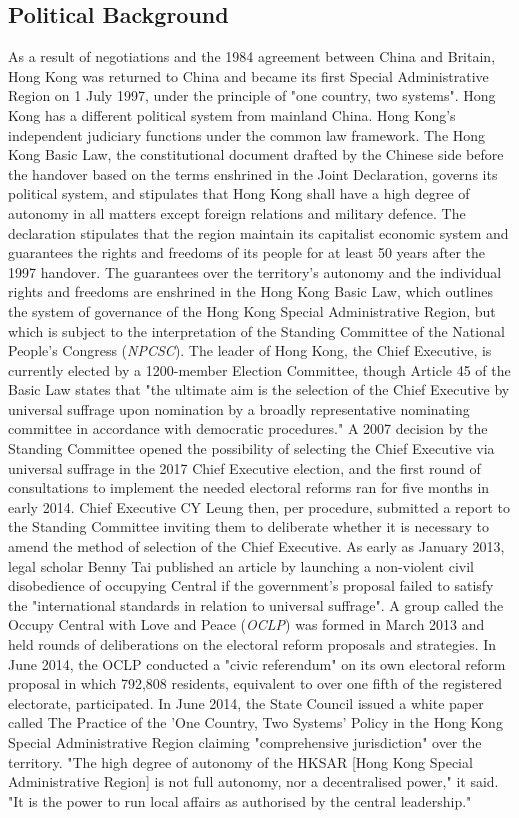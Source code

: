 \documentclass[10pt,conference,a4paper]{IEEEtran}%
\begin{document}
\subsection{Political Background}
As a result of negotiations and the 1984 agreement between China and Britain, Hong Kong was returned to China and became its first Special Administrative Region on 1 July 1997, under the principle of "one country, two systems". Hong Kong has a different political system from mainland China. Hong Kong's independent judiciary functions under the common law framework. The Hong Kong Basic Law, the constitutional document drafted by the Chinese side before the handover based on the terms enshrined in the Joint Declaration, governs its political system, and stipulates that Hong Kong shall have a high degree of autonomy in all matters except foreign relations and military defence. The declaration stipulates that the region maintain its capitalist economic system and guarantees the rights and freedoms of its people for at least 50 years after the 1997 handover. The guarantees over the territory's autonomy and the individual rights and freedoms are enshrined in the Hong Kong Basic Law, which outlines the system of governance of the Hong Kong Special Administrative Region, but which is subject to the interpretation of the Standing Committee of the National People's Congress (\emph{NPCSC}).
The leader of Hong Kong, the Chief Executive, is currently elected by a 1200-member Election Committee, though Article 45 of the Basic Law states that "the ultimate aim is the selection of the Chief Executive by universal suffrage upon nomination by a broadly representative nominating committee in accordance with democratic procedures." A 2007 decision by the Standing Committee opened the possibility of selecting the Chief Executive via universal suffrage in the 2017 Chief Executive election, and the first round of consultations to implement the needed electoral reforms ran for five months in early 2014. Chief Executive CY Leung then, per procedure, submitted a report to the Standing Committee inviting them to deliberate whether it is necessary to amend the method of selection of the Chief Executive.
As early as January 2013, legal scholar Benny Tai published an article by launching a non-violent civil disobedience of occupying Central if the government's proposal failed to satisfy the "international standards in relation to universal suffrage". A group called the Occupy Central with Love and Peace (\emph{OCLP}) was formed in March 2013 and held rounds of deliberations on the electoral reform proposals and strategies. In June 2014, the OCLP conducted a "civic referendum" on its own electoral reform proposal in which 792,808 residents, equivalent to over one fifth of the registered electorate, participated.
In June 2014, the State Council issued a white paper called The Practice of the 'One Country, Two Systems' Policy in the Hong Kong Special Administrative Region claiming "comprehensive jurisdiction" over the territory. "The high degree of autonomy of the HKSAR [Hong Kong Special Administrative Region] is not full autonomy, nor a decentralised power," it said. "It is the power to run local affairs as authorised by the central leadership."
\end{document}
